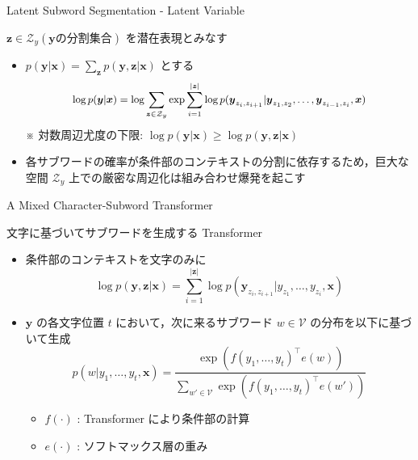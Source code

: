 \documentclass[unicode, 12pt, aspectratio=43]{beamer}
\begin{document}
\begin{frame}[label={sec:org6f2123a}]{\normalsize Latent Subword Segmentation - Latent Variable}
\begin{block}{\(\boldsymbol{z} \in \mathcal{Z}_{y} (\boldsymbol{y} \text{の分割集合})\) を潜在表現とみなす}
\begin{itemize}
\item \(p(\boldsymbol{y} | \boldsymbol{x}) = \sum_{\boldsymbol{z}} p(\boldsymbol{y}, \boldsymbol{z} | \boldsymbol{x})\) とする
\begin{equation*}
  \small \log p(\boldsymbol{y} | \boldsymbol{x}) = \log\sum_{\boldsymbol{z}\in\mathcal{Z}_y}\exp\sum_{i=1}^{|\boldsymbol{z}|} \log p(\boldsymbol{y}_{z_i, z_{i+1}} | \boldsymbol{y}_{z_1, z_2},\ldots,\boldsymbol{y}_{z_{i-1}, z_i}, \boldsymbol{x})
\end{equation*}
※ 対数周辺尤度の下限: \(\log p(\boldsymbol{y} | \boldsymbol{x}) \ge \log p(\boldsymbol{y}, \boldsymbol{z} | \boldsymbol{x})\)

\item 各サブワードの確率が条件部のコンテキストの分割に依存するため，巨大な空間 \(\mathcal{Z}_y\) 上での厳密な周辺化は組み合わせ爆発を起こす
\end{itemize}
\end{block}
\end{frame}

\begin{frame}[label={sec:org53ff096}]{A Mixed Character-Subword Transformer}
\begin{block}{文字に基づいてサブワードを生成する Transformer}
\begin{itemize}
\item 条件部のコンテキストを文字のみに
\begin{equation*}
  \log p(\boldsymbol{y}, \boldsymbol{z} | \boldsymbol{x}) = \sum_{i=1}^{|\boldsymbol{z}|} \log p(\boldsymbol{y}_{z_i, z_{i+1}} | y_{z_1}, \ldots, y_{z_i}, \boldsymbol{x})
\end{equation*}

\item \(\boldsymbol{y}\) の各文字位置 \(t\) において，次に来るサブワード \(w \in \mathcal{V}\) の分布を以下に基づいて生成
\begin{equation*}
  p(w | y_{1}, \ldots, y_{t}, \boldsymbol{x}) = \frac{\exp(f(y_1,\ldots,y_t)^\top e(w))}{\sum_{w' \in \mathcal{V}}\exp(f(y_1,\ldots,y_t)^\top e(w'))}
\end{equation*}
\begin{itemize}
\item \vspace{-0.5cm} \(f(\cdot)\) : Transformer により条件部の計算
\item \(e(\cdot)\) : ソフトマックス層の重み
\end{itemize}
\end{itemize}
\end{block}
\end{frame}
\end{document}
